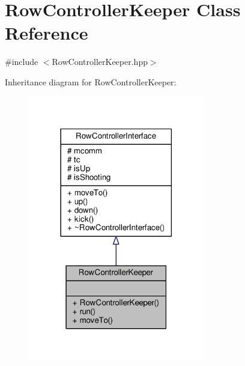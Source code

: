 \hypertarget{class_row_controller_keeper}{}\section{Row\+Controller\+Keeper Class Reference}
\label{class_row_controller_keeper}


{\ttfamily \#include $<$Row\+Controller\+Keeper.\+hpp$>$}



Inheritance diagram for Row\+Controller\+Keeper\+:\nopagebreak
\begin{figure}[H]
\begin{center}
\leavevmode
\includegraphics[width=218pt]{class_row_controller_keeper__inherit__graph}
\end{center}
\end{figure}


